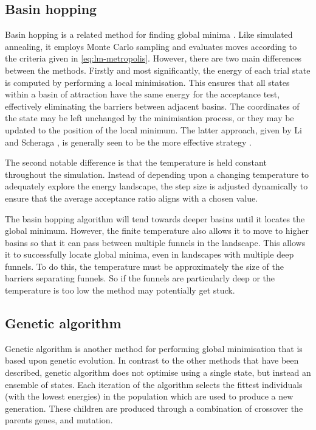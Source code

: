 \subsection{Basin hopping}
Basin hopping is a related method for finding global minima \cite{Wales1997}.
Like simulated annealing, it employs Monte Carlo sampling and evaluates moves according to the criteria given in \cref{eq:lm-metropolis}.
However, there are two main differences between the methods.
Firstly and most significantly, the energy of each trial state is computed by performing a local minimisation.
This ensures that all states within a basin of attraction have the same energy for the acceptance test, effectively eliminating the barriers between adjacent basins.
The coordinates of the state may be left unchanged by the minimisation process, or they may be updated to the position of the local minimum.
The latter approach, given by Li and Scheraga \cite{Li1987}, is generally seen to be the more effective strategy \cite{Wales2004}.

The second notable difference is that the temperature is held constant throughout the simulation.
Instead of depending upon a changing temperature to adequately explore the energy landscape, the step size is adjusted dynamically to ensure that the average acceptance ratio aligns with a chosen value.

The basin hopping algorithm will tend towards deeper basins until it locates the global minimum.
However, the finite temperature also allows it to move to higher basins so that it can pass between multiple funnels in the landscape.
This allows it to successfully locate global minima, even in landscapes with multiple deep funnels.
To do this, the temperature must be approximately the size of the barriers separating funnels.
So if the funnels are particularly deep or the temperature is too low the method may potentially get stuck.


\subsection{Genetic algorithm}
Genetic algorithm is another method for performing global minimisation \cite{Katoch2021} that is based upon genetic evolution.
In contrast to the other methods that have been described, genetic algorithm does not optimise using a single state, but instead an ensemble of states.
Each iteration of the algorithm selects the fittest individuals (with the lowest energies) in the population which are used to produce a new generation.
These children are produced through a combination of crossover the parents genes, and mutation.

